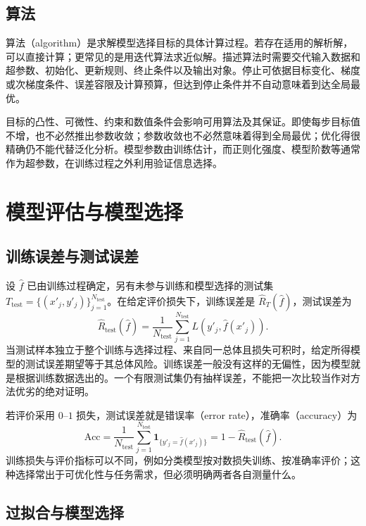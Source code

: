 \subsection{算法}
\label{subsec:lh-algorithm}

算法（algorithm）是求解模型选择目标的具体计算过程。若存在适用的解析解，可以直接计算；更常见的是用迭代算法求近似解。描述算法时需要交代输入数据和超参数、初始化、更新规则、终止条件以及输出对象。停止可依据目标变化、梯度或次梯度条件、误差容限及计算预算，但达到停止条件并不自动意味着到达全局最优。

目标的凸性、可微性、约束和数值条件会影响可用算法及其保证。即使每步目标值不增，也不必然推出参数收敛；参数收敛也不必然意味着得到全局最优；优化得很精确仍不能代替泛化分析。模型参数由训练估计，而正则化强度、模型阶数等通常作为超参数，在训练过程之外利用验证信息选择。

\section{模型评估与模型选择}
\label{sec:lh-model-evaluation}

\subsection{训练误差与测试误差}
\label{subsec:lh-training-test-error}

设 $\widehat f$ 已由训练过程确定，另有未参与训练和模型选择的测试集 $T_{\mathrm{test}}=\{(x'_j,y'_j)\}_{j=1}^{N_{\mathrm{test}}}$。在给定评价损失下，训练误差是 $\widehat R_T(\widehat f)$，测试误差为
\begin{equation}
    \widehat R_{\mathrm{test}}(\widehat f)
      =\frac1{N_{\mathrm{test}}}\sum_{j=1}^{N_{\mathrm{test}}}
        L(y'_j,\widehat f(x'_j)).
    \label{eq:lh-test-risk}
\end{equation}
当测试样本独立于整个训练与选择过程、来自同一总体且损失可积时，给定所得模型的测试误差期望等于其总体风险。训练误差一般没有这样的无偏性，因为模型就是根据训练数据选出的。一个有限测试集仍有抽样误差，不能把一次比较当作对方法优劣的绝对证明。

若评价采用 $0$--$1$ 损失，测试误差就是错误率（error rate），准确率（accuracy）为
\[
    \mathrm{Acc}=\frac1{N_{\mathrm{test}}}
      \sum_{j=1}^{N_{\mathrm{test}}}\mathbf1_{\{y'_j=\widehat f(x'_j)\}}
      =1-\widehat R_{\mathrm{test}}(\widehat f).
\]
训练损失与评价指标可以不同，例如分类模型按对数损失训练、按准确率评价；这种选择常出于可优化性与任务需求，但必须明确两者各自测量什么。

\subsection{过拟合与模型选择}
\label{subsec:lh-overfitting}

